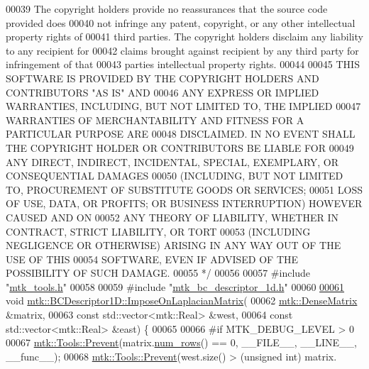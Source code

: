 \begin{DoxyCode}
00039 \textcolor{comment}{The copyright holders provide no reassurances that the source code provided does}
00040 \textcolor{comment}{not infringe any patent, copyright, or any other intellectual property rights of}
00041 \textcolor{comment}{third parties. The copyright holders disclaim any liability to any recipient for}
00042 \textcolor{comment}{claims brought against recipient by any third party for infringement of that}
00043 \textcolor{comment}{parties intellectual property rights.}
00044 \textcolor{comment}{}
00045 \textcolor{comment}{THIS SOFTWARE IS PROVIDED BY THE COPYRIGHT HOLDERS AND CONTRIBUTORS "AS IS" AND}
00046 \textcolor{comment}{ANY EXPRESS OR IMPLIED WARRANTIES, INCLUDING, BUT NOT LIMITED TO, THE IMPLIED}
00047 \textcolor{comment}{WARRANTIES OF MERCHANTABILITY AND FITNESS FOR A PARTICULAR PURPOSE ARE}
00048 \textcolor{comment}{DISCLAIMED. IN NO EVENT SHALL THE COPYRIGHT HOLDER OR CONTRIBUTORS BE LIABLE FOR}
00049 \textcolor{comment}{ANY DIRECT, INDIRECT, INCIDENTAL, SPECIAL, EXEMPLARY, OR CONSEQUENTIAL DAMAGES}
00050 \textcolor{comment}{(INCLUDING, BUT NOT LIMITED TO, PROCUREMENT OF SUBSTITUTE GOODS OR SERVICES;}
00051 \textcolor{comment}{LOSS OF USE, DATA, OR PROFITS; OR BUSINESS INTERRUPTION) HOWEVER CAUSED AND ON}
00052 \textcolor{comment}{ANY THEORY OF LIABILITY, WHETHER IN CONTRACT, STRICT LIABILITY, OR TORT}
00053 \textcolor{comment}{(INCLUDING NEGLIGENCE OR OTHERWISE) ARISING IN ANY WAY OUT OF THE USE OF THIS}
00054 \textcolor{comment}{SOFTWARE, EVEN IF ADVISED OF THE POSSIBILITY OF SUCH DAMAGE.}
00055 \textcolor{comment}{*/}
00056 
00057 \textcolor{preprocessor}{#include "\hyperlink{mtk__tools_8h}{mtk\_tools.h}"}
00058 
00059 \textcolor{preprocessor}{#include "\hyperlink{mtk__bc__descriptor__1d_8h}{mtk\_bc\_descriptor\_1d.h}"}
00060 
\hypertarget{mtk__bc__descriptor__1d_8cc_source_l00061}{}\hyperlink{classmtk_1_1BCDescriptor1D_a33e51235eaa930e4470f027001a023cf}{00061} \textcolor{keywordtype}{void} \hyperlink{classmtk_1_1BCDescriptor1D_a33e51235eaa930e4470f027001a023cf}{mtk::BCDescriptor1D::ImposeOnLaplacianMatrix}(
00062     \hyperlink{classmtk_1_1DenseMatrix}{mtk::DenseMatrix} &matrix,
00063     \textcolor{keyword}{const} std::vector<mtk::Real> &west,
00064     \textcolor{keyword}{const} std::vector<mtk::Real> &east) \{
00065 
00066 \textcolor{preprocessor}{  #if MTK\_DEBUG\_LEVEL > 0}
00067   \hyperlink{classmtk_1_1Tools_afe5bb096309258e2e72503fd7b41c7e0}{mtk::Tools::Prevent}(matrix.\hyperlink{classmtk_1_1DenseMatrix_a17d8d3b9cc0926044b6972dd190a5c21}{num\_rows}() == 0, \_\_FILE\_\_, \_\_LINE\_\_, \_\_func\_\_);
00068   \hyperlink{classmtk_1_1Tools_afe5bb096309258e2e72503fd7b41c7e0}{mtk::Tools::Prevent}(west.size() > (\textcolor{keywordtype}{unsigned} int) matrix.

\end{DoxyCode}
